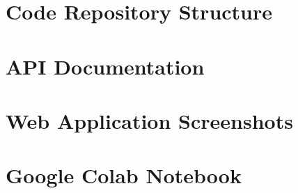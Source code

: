 \documentclass[12pt, a4paper]{article}
\begin{document}
\newpage
\appendix

\section{Code Repository Structure}

\section{API Documentation}

\section{Web Application Screenshots}

\section{Google Colab Notebook}
\end{document}

